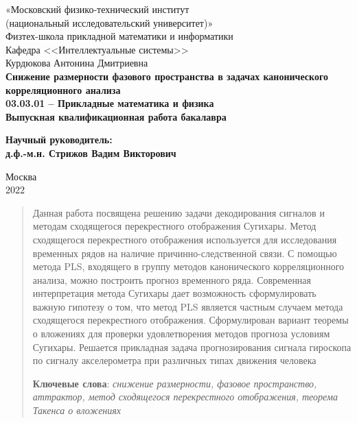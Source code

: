 \documentclass[12pt]{extarticle}
\begin{document}
\thispagestyle{empty}
\begin{center}
    \sc
        «Московский физико-технический институт\\
        \rm{(национальный исследовательский университет)}»\\
        Физтех-школа прикладной математики и информатики\\
        Кафедра <<Интеллектуальные системы>>
        \\[25mm]
    \rm\large
        Курдюкова Антонина Дмитриевна\\[10mm]
    \bf\Large
		Снижение размерности фазового пространства в задачах канонического корреляционного анализа\\[10mm]
    \rm\normalsize
        03.03.01 -- Прикладные математика и физика\\[10mm]
    \sc
        Выпускная квалификационная работа бакалавра\\[10mm]
\end{center}
\hfill\parbox{75mm}{
    \begin{flushleft}
    \bf
        Научный руководитель:\\
    \rm
        д.ф.-м.н. Стрижов Вадим Викторович\\[3.9cm]
    \end{flushleft}
}
\begin{center}
    Москва\\
    2022
\end{center}

\newpage
\tableofcontents
\newpage

\begin{abstract}
Данная работа посвящена решению задачи декодирования сигналов и методам сходящегося перекрестного отображения Сугихары. Метод сходящегося перекрестного отображения используется для исследования временных рядов на наличие причинно-следственной связи. С помощью метода PLS, входящего в группу методов канонического корреляционного анализа, можно построить прогноз временного ряда. Современная интерпретация метода Сугихары дает возможность сформулировать важную  гипотезу о том, что метод PLS является частным случаем метода сходящегося перекрестного отображения. 
Сформулирован вариант теоремы о вложениях 
для проверки удовлетворения методов прогноза условиям Сугихары. Решается прикладная задача прогнозирования сигнала гироскопа по сигналу акселерометра при различных типах движения человека
\\
\bigskip
\noindent

\textbf{Ключевые слова}: \emph {снижение размерности, фазовое пространство, аттрактор, метод сходящегося перекрестного отображения, теорема Такенса о вложениях}
\end{abstract}
\newpage
\end{document}
